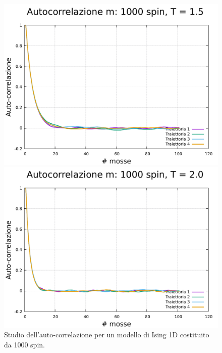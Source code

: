 \begin{figure}[htbp]
    \begin{minipage}{0.45\textwidth}  
      \centering
      \includegraphics[page=1, width=\textwidth]{Immagini/simIsing1D/magn0.0/tcorr/auto_1000_1.5.pdf}
      \caption{$T\,=\,1.5$}
    \end{minipage}\hfill
    \begin{minipage}{0.45\textwidth}  
      \centering
      \includegraphics[page=1, width=\textwidth]{Immagini/simIsing1D/magn0.0/tcorr/auto_1000_2.0.pdf}
      \caption{$T\,=\,2.0$}
    \end{minipage}
    \caption{Studio dell'auto-correlazione per un modello di Ising 1D costituito da 1000 spin.}
\end{figure}

